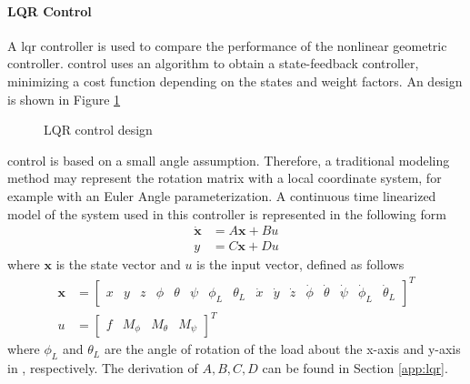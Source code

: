 \paragraph{LQR Control}
A \acf{lqr} controller is used to compare the performance of the nonlinear geometric controller. 
 control uses an algorithm to obtain a state-feedback controller, minimizing a cost function depending on the states and weight factors. 
An  design is shown in Figure \ref{fig:set.lqr}
\begin{figure}[h!]
	\centering
	\caption{LQR control design\label{fig:set.lqr}}
\end{figure}

 control is based on a small angle assumption. Therefore, a traditional modeling method may represent the rotation matrix with a local coordinate system, for example with an Euler Angle parameterization. 
A continuous time linearized model of the system used in this controller is represented in the following form 
\begin{align}\label{eq:ss}
\mathbf{\dot{x} }&=A\mathbf{x}+Bu\\
y&=C\mathbf{x}+Du
\end{align}
where $ \mathbf{x} $ is the state vector and $ u $ is the input vector, defined as follows
\begin{align}\label{eq:state}
\mathbf{x}&=\begin{bmatrix}
x&y&z&\phi&\theta&\psi&\phi_L&\theta_L&\dot{x}&\dot{y}&\dot{z}&\dot{\phi}&\dot{\theta}&\dot{\psi}&\dot{\phi}_L&\dot{\theta}_L
\end{bmatrix}^T\\
	u&=\begin{bmatrix}
		f&M_\phi&M_\theta&M_\psi
	\end{bmatrix}^T
\end{align}
where $ \phi_L $ and $ \theta_L $ are the angle of rotation of the load about the x-axis and y-axis in \BF, respectively.
The derivation of $ A, B, C, D $ can be found in Section \ref{app:lqr}. 

